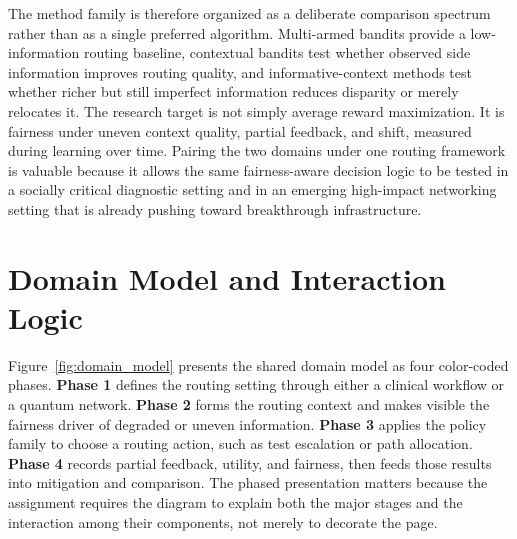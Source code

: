 \documentclass{IEEEtran}
\begin{document}
The method family is therefore organized as a deliberate comparison spectrum rather than as a single preferred algorithm. Multi-armed bandits provide a low-information routing baseline, contextual bandits test whether observed side information improves routing quality, and informative-context methods test whether richer but still imperfect information reduces disparity or merely relocates it. The research target is not simply average reward maximization. It is fairness under uneven context quality, partial feedback, and shift, measured during learning over time. Pairing the two domains under one routing framework is valuable because it allows the same fairness-aware decision logic to be tested in a socially critical diagnostic setting and in an emerging high-impact networking setting that is already pushing toward breakthrough infrastructure.

\section{Domain Model and Interaction Logic}
Figure~\ref{fig:domain_model} presents the shared domain model as four color-coded phases. \textbf{Phase 1} defines the routing setting through either a clinical workflow or a quantum network. \textbf{Phase 2} forms the routing context and makes visible the fairness driver of degraded or uneven information. \textbf{Phase 3} applies the policy family to choose a routing action, such as test escalation or path allocation. \textbf{Phase 4} records partial feedback, utility, and fairness, then feeds those results into mitigation and comparison. The phased presentation matters because the assignment requires the diagram to explain both the major stages and the interaction among their components, not merely to decorate the page.
\end{document}
